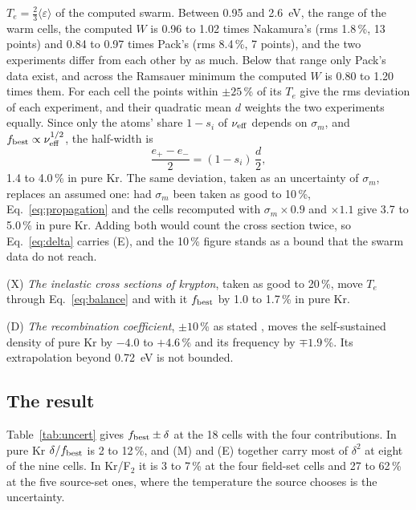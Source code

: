 \documentclass[11pt]{article}
\numberwithin{equation}{section}
\newcommand{\nueff}{\nu_{\rm eff}}
\newcommand{\fbest}{f_{\rm best}}
\newcommand{\Te}{T_e}
\begin{document}
$\Te=\tfrac23\langle\varepsilon\rangle$ of the computed swarm. Between 0.95 and 2.6~eV, the range of the
warm cells, the computed $W$ is 0.96 to 1.02 times Nakamura's (rms 1.8\,\%, 13 points) and 0.84
to 0.97 times Pack's (rms 8.4\,\%, 7 points), and the two experiments differ from each other by
as much. Below that range only Pack's data exist, and across the Ramsauer minimum the computed
$W$ is 0.80 to 1.20 times them. For each cell the points within $\pm25$\,\% of its $\Te$ give the
rms deviation of each experiment, and their quadratic mean $d$ weights the two experiments
equally. Since only the atoms' share $1-s_i$ of $\nueff$ depends on $\sigma_m$, and
$\fbest\propto\nueff^{1/2}$, the half-width is
\begin{equation}
\boxed{\;\frac{e_+-e_-}{2}=(1-s_i)\,\frac d2,\;}
\label{eq:swarm}
\end{equation}
1.4 to 4.0\,\% in pure Kr. The same deviation, taken as an uncertainty of $\sigma_m$, replaces an
assumed one: had $\sigma_m$ been taken as good to 10\,\%, Eq.~\eqref{eq:propagation} and the cells
recomputed with $\sigma_m\times0.9$ and $\times1.1$ give 3.7 to 5.0\,\% in pure Kr. Adding both would
count the cross section twice, so Eq.~\eqref{eq:delta} carries (E), and the 10\,\% figure stands as
a bound that the swarm data do not reach.

{\noindent}(X) \emph{The inelastic cross sections of krypton}, taken as good to 20\,\%,
move $\Te$ through Eq.~\eqref{eq:balance} and with it $\fbest$ by 1.0 to 1.7\,\% in pure Kr.

{\noindent}(D) \emph{The recombination coefficient}, $\pm10$\,\% as stated
\cite{ShiuBiondi1977}, moves the self-sustained density of pure Kr by $-4.0$ to $+4.6$\,\%
and its frequency by $\mp1.9$\,\%. Its extrapolation beyond 0.72~eV is not bounded.

\subsection{The result}
\label{sec:uresult}
Table~\ref{tab:uncert} gives $\fbest\pm\delta$ at the 18 cells with the four contributions.
In pure Kr $\delta/\fbest$ is 2 to 12\,\%, and (M) and (E) together carry most of $\delta^2$ at eight
of the nine cells. In Kr/F$_2$ it is 3 to
7\,\% at the four field-set cells and 27 to 62\,\% at the five source-set ones, where the
temperature the source chooses is the uncertainty.
\end{document}
